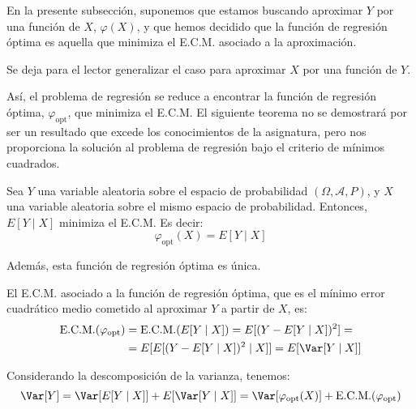 En la presente subsección, suponemos que estamos buscando aproximar $Y$ por una función de $X$, $\varphi(X)$, y que hemos decidido que la función de regresión óptima es aquella que minimiza el E.C.M. asociado a la aproximación. 
\begin{observacion}
    Se deja para el lector generalizar el caso para aproximar $X$ por una función de $Y$.
\end{observacion}

Así, el problema de regresión se reduce a encontrar la función de regresión óptima, $\varphi_{\text{opt}}$, que minimiza el E.C.M. El siguiente teorema no se demostrará por ser un resultado que excede los conocimientos de la asignatura, pero nos proporciona la solución al problema de regresión bajo el criterio de mínimos cuadrados.
\begin{teo}
    Sea $Y$ una variable aleatoria sobre el espacio de probabilidad $(\Omega, \mathcal{A}, P)$, y $X$ una variable aleatoria sobre el mismo espacio de probabilidad. Entonces, $E[Y\mid X]$ minimiza el E.C.M. Es decir:
    \begin{equation*}
        \varphi_{\text{opt}}(X) = E[Y\mid X]
    \end{equation*}

    Además, esta función de regresión óptima es única.
\end{teo}

El E.C.M. asociado a la función de regresión óptima, que es el mínimo error cuadrático medio cometido al aproximar $Y$ a partir de $X$, es:
\begin{align*}
    \text{E.C.M.}(\varphi_{\text{opt}}) &=
    \text{E.C.M.}(E[Y\mid X]) = E[(Y - E[Y\mid X])^2]
    =\\&=
    E[E[(Y - E[Y\mid X])^2\mid X]] = E[\Var[Y\mid X]]
\end{align*}

Considerando la descomposición de la varianza, tenemos:
\begin{equation*}
    \Var[Y]=\Var[E[Y\mid X]] + E[\Var[Y\mid X]]
    = \Var[\varphi_{\text{opt}}(X)] + \text{E.C.M.}(\varphi_{\text{opt}})
\end{equation*}


